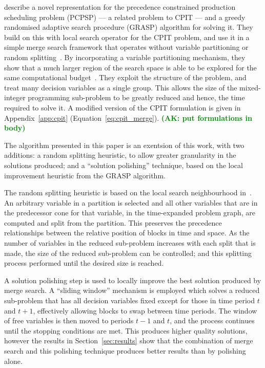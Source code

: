 \documentclass[preprint]{elsarticle}
\newcommand{\ak}[1]{\textbf{\textcolor{green}{(AK: #1)}}}
\begin{document}
\citet{gecco17} describe a novel representation for the precedence constrained production scheduling problem (PCPSP) --- a related problem to CPIT --- and a greedy randomised adaptive search procedure (GRASP) algorithm for solving it. They build on this with local search operator for the CPIT problem, and use it in a simple merge search framework that operates without variable partitioning or random splitting~\citep{gecco18}. By incorporating a variable partitioning mechanism, they show that a much larger region of the search space is able to be explored for the same computational budget~\citep{gecco19}. They exploit the structure of the problem, and treat many decision variables as a single group. This allows the size of the mixed-integer programming sub-problem to be greatly reduced and hence, the time required to solve it. A modified version of the CPIT formulation is given in Appendix~\ref{app:cpit} (Equation~\ref{eq:cpit_merge}).
\ak{put formulations in body}

The algorithm presented in this paper is an exentsion of this work, with two additions: a random splitting heuristic, to allow greater granularity in the solutions produced; and a ``solution polishing'' technique, based on the local improvement heuristic from the GRASP algorithm.

The random splitting heuristic is based on the local search neighbourhood in~\citet{gecco18}. An arbitrary variable in a partition is selected and all other variables that are in the predecessor cone for that variable, in the time-expanded problem graph, are computed and split from the partition. This preserves the precedence relationships between the relative position of blocks in time and space. As the number of variables in the reduced sub-problem increases with each split that is made, the size of the reduced sub-problem can be controlled; and this splitting process performed until the desired size is reached.

A solution polishing step is used to locally improve the best solution produced by merge search. A ``sliding window'' mechanism is employed which solves a reduced sub-problem that has all decision variables fixed except for those in time period $t$ and $t+1$, effectively allowing blocks to swap between time periods. The window of free variables is then moved to periods $t-1$ and $t$, and the process continues until the stopping conditions are met. This produces higher quality solutions, however the results in Section~\ref{sec:results} show that the combination of merge search and this polishing technique produces better results than by polishing alone.
\end{document}
